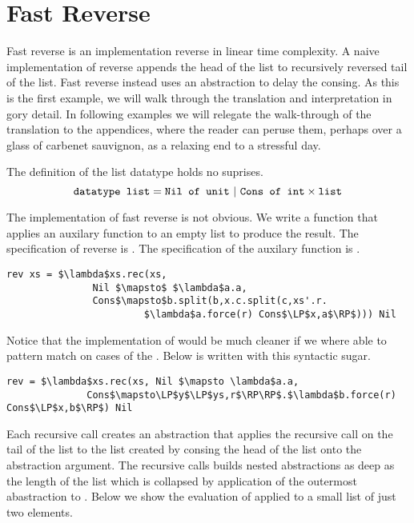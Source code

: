\section{Fast Reverse}
Fast reverse is an implementation reverse in linear time complexity.
A naive implementation of reverse appends the head of the list to recursively
reversed tail of  the list. Fast reverse instead uses an abstraction to delay
the consing. As this is the first example, we will walk through the translation
and interpretation in gory detail. In following examples we will relegate the
walk-through of the translation to the appendices, where the reader can peruse
them, perhaps over a glass of carbenet sauvignon, as a relaxing end to a
stressful day.

The definition of the list datatype holds no suprises.
\[ \texttt{datatype list} = \texttt{Nil of unit}\ |\ \texttt{Cons of int} \times \texttt{list} \]

The implementation of fast reverse is not obvious. We write a function 
that applies an auxilary function to an empty list to produce the result.  The
specification of reverse is . The specification of the auxilary function
 is .

\begin{lstlisting}
rev xs = $\lambda$xs.rec(xs,
               Nil $\mapsto$ $\lambda$a.a,
               Cons$\mapsto$b.split(b,x.c.split(c,xs'.r.
                        $\lambda$a.force(r) Cons$\LP$x,a$\RP$))) Nil
\end{lstlisting}

Notice that the implementation of  would be much cleaner if we where
able to pattern match on cases of the . Below is  written with
this syntactic sugar.

\begin{lstlisting}
rev = $\lambda$xs.rec(xs, Nil $\mapsto \lambda$a.a,
              Cons$\mapsto\LP$y$\LP$ys,r$\RP\RP$.$\lambda$b.force(r) Cons$\LP$x,b$\RP$) Nil
\end{lstlisting}

Each recursive call creates an abstraction that applies the recursive call on
the tail of the list to the list created by consing the head of the list onto
the abstraction argument. The recursive calls builds nested abstractions as
deep as the length of the list which is collapsed by application of the
outermost abastraction to . Below we show the evaluation of 
applied to a small list of just two elements.

